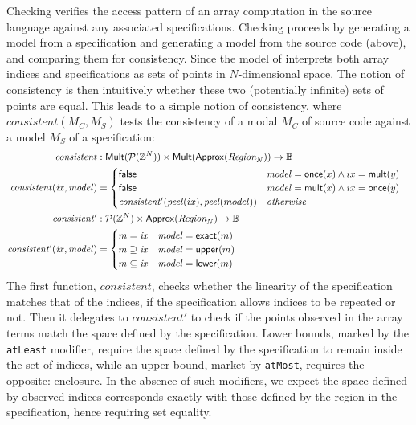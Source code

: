 \noindent
Checking verifies the access pattern of an array computation in the
source language against any associated specifications. Checking
proceeds by generating a model from a specification and generating a
model from the source code (above), and comparing them for
consistency.  Since the model of  interprets both
array indices and specifications as sets of points in $N$-dimensional
space. The notion of consistency is then intuitively whether these two
(potentially infinite) sets of points are equal. This leads to a
simple notion of consistency, where $\mathit{consistent}(M_C, M_S)$
tests the consistency of a modal $M_C$ of source code against
a model $M_S$ of a specification:
%
\begin{align*}
  \mathit{consistent} & :
    \mathsf{Mult}(\mathcal{P}(\bz{}^N)) \times
    \mathsf{Mult}(\mathsf{Approx}(\region{N})) \to \mathbb{B} & \\
%
  \mathit{consistent}(\mathit{ix}, \mathit{model}) & = \begin{cases}
    \mathsf{false} & \mathit{model} = \mathsf{once}(x) \wedge ix =
    \mathsf{mult}(y) \\
    \mathsf{false} & \mathit{model} = \mathsf{mult}(x) \wedge ix = \mathsf{once}(y) \\
    \mathit{consistent'}(\mathit{peel}(ix), \mathit{peel}(model)) & \textit{otherwise}
  \end{cases} \\
%
  \mathit{consistent'} & :
    \mathcal{P}(\bz{}^N) \times
    \mathsf{Approx}(\region{N}) \to \mathbb{B} & \\
%
  \mathit{consistent'}(\mathit{ix}, \mathit{model}) & = \begin{cases}
    m = \mathit{ix} & \mathit{model} = \mathsf{exact}(m) \\
    m \supseteq \mathit{ix} & \mathit{model} = \mathsf{upper}(m) \\
    m \subseteq \mathit{ix} & \mathit{model} = \mathsf{lower}(m)
  \end{cases}
\end{align*}
%
The first function, $\mathit{consistent}$, checks whether the linearity of the
specification matches that of the indices, \ie{} if the specification allows
indices to be repeated or not. Then it delegates to $\mathit{consistent'}$
to check if the points observed in the array terms match the space
defined by the specification. Lower bounds, marked by the \texttt{atLeast}
modifier, require the space defined by the specification to remain inside the
set of indices, while an upper bound, market by \texttt{atMost},
requires the opposite: enclosure. In the absence of such modifiers, we expect
the space defined by observed indices corresponds exactly with those defined by the
region in the specification, hence requiring set equality.

